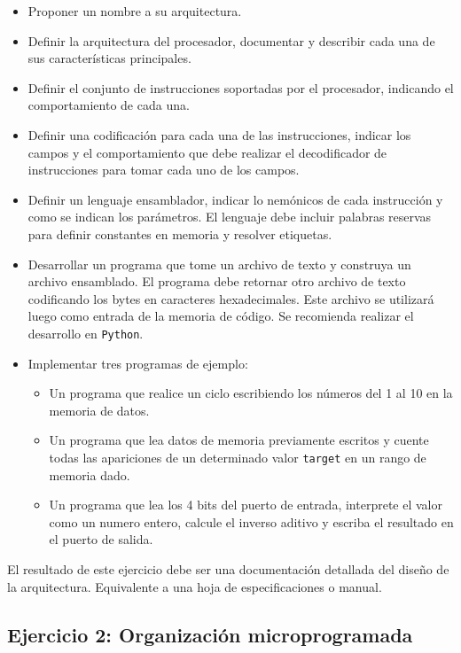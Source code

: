 \documentclass[a4paper,11pt]{article}
\begin{document}
\begin{itemize}
\item Proponer un nombre a su arquitectura.

\item Definir la arquitectura del procesador, documentar y describir cada una de sus características principales.

\item Definir el conjunto de instrucciones soportadas por el procesador, indicando el comportamiento de cada una.

\item Definir una codificación para cada una de las instrucciones, indicar los campos y el comportamiento que debe realizar el decodificador de instrucciones para tomar cada uno de los campos.

\item Definir un lenguaje ensamblador, indicar lo nemónicos de cada instrucción y como se indican los parámetros. El lenguaje debe incluir palabras reservas para definir constantes en memoria y resolver etiquetas.

\item Desarrollar un programa que tome un archivo de texto y construya un archivo ensamblado. El programa debe retornar otro archivo de texto codificando los bytes en caracteres hexadecimales. Este archivo se utilizará luego como entrada de la memoria de código. Se recomienda realizar el desarrollo en \texttt{Python}.

\item Implementar tres programas de ejemplo:
\begin{itemize}
 \item Un programa que realice un ciclo escribiendo los números del 1 al 10 en la memoria de datos.
 \item Un programa que lea datos de memoria previamente escritos y cuente todas las apariciones de un determinado valor \texttt{target} en un rango de memoria dado.
 \item Un programa que lea los 4 bits del puerto de entrada, interprete el valor como un numero entero, calcule el inverso aditivo y escriba el resultado en el puerto de salida.
\end{itemize}
\end{itemize}

El resultado de este ejercicio debe ser una documentación detallada del diseño de la arquitectura. Equivalente a una hoja de especificaciones o manual.

\subsection{Ejercicio 2: Organización microprogramada}
\end{document}
